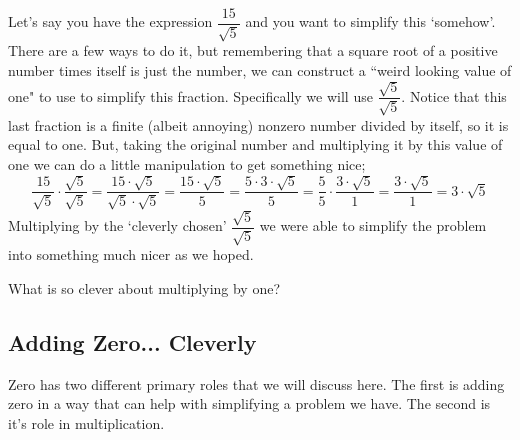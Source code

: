 \documentclass{ximera}
\begin{document}
    \begin{explanation}%
        Let's say you have the expression $\dfrac{15}{\sqrt{5}}$ and you want to simplify this `somehow'. There are a few ways to do it, but remembering that a square root of a positive number times itself is just the number, we can construct a ``weird looking value of one" to use to simplify this fraction. Specifically we will use $\dfrac{\sqrt{5}}{\sqrt{5}}$. Notice that this last fraction is a finite (albeit annoying) nonzero number divided by itself, so it is equal to one. But, taking the original number and multiplying it by this value of one we can do a little manipulation to get something nice;
        \[
            \dfrac{15}{\sqrt{5}} \cdot \dfrac{\sqrt{5}}{\sqrt{5}}
                = \dfrac{15 \cdot \sqrt{5}}{\sqrt{5}\cdot\sqrt{5}}
                = \dfrac{15 \cdot \sqrt{5}}{5}
                = \dfrac{5 \cdot 3 \cdot \sqrt{5}}{5}
                = \dfrac{5}{5} \cdot\dfrac{3 \cdot \sqrt{5}}{1}
                = \dfrac{3 \cdot \sqrt{5}}{1}
                = 3 \cdot \sqrt{5}
        \]
        Multiplying by the `cleverly chosen' $\dfrac{\sqrt{5}}{\sqrt{5}}$ we were able to simplify the problem into something much nicer as we hoped.
    \end{explanation}%

    \begin{problem}
        What is so clever about multiplying by one?
        \begin{multipleChoice}
        \end{multipleChoice}
    \end{problem}

\subsection*{Adding Zero... Cleverly}
    
    Zero has two different primary roles that we will discuss here. The first is adding zero in a way that can help with simplifying a problem we have. The second is it's role in multiplication.
    
\end{document}
